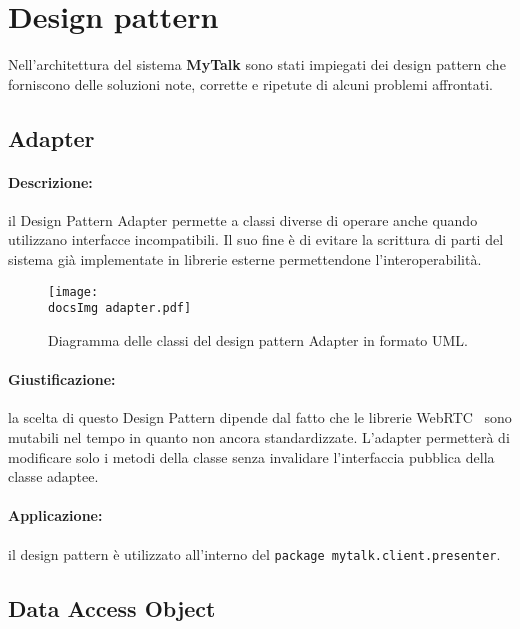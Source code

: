 \section{Design pattern}{
Nell'architettura del sistema \textbf{MyTalk} sono stati impiegati dei design pattern che forniscono delle soluzioni note, corrette e ripetute di alcuni problemi affrontati.

	\subsection{Adapter}{
\paragraph{Descrizione: }{il Design Pattern Adapter permette a classi diverse di operare anche quando utilizzano interfacce incompatibili. Il suo fine è di evitare la scrittura di parti del sistema già implementate in librerie esterne permettendone l'interoperabilità.\\
	\begin{figure}[h!tbp]
		\centering
		\texttt{[image: \\docsImg adapter.pdf]}
		\caption{Diagramma delle classi del design pattern Adapter in formato UML\g .}
	\end{figure}
	}
	\paragraph{Giustificazione: }{la scelta di questo Design Pattern dipende dal fatto che le librerie WebRTC\g~ sono mutabili nel tempo in quanto non ancora standardizzate. L'adapter permetterà di modificare solo i metodi della classe senza invalidare l'interfaccia pubblica della classe adaptee.
	}
	\paragraph{Applicazione: }{il design pattern è utilizzato all'interno del \nolinkurl{package mytalk.client.presenter}.	
	}
	}

\subsection{Data Access Object}{
}}
